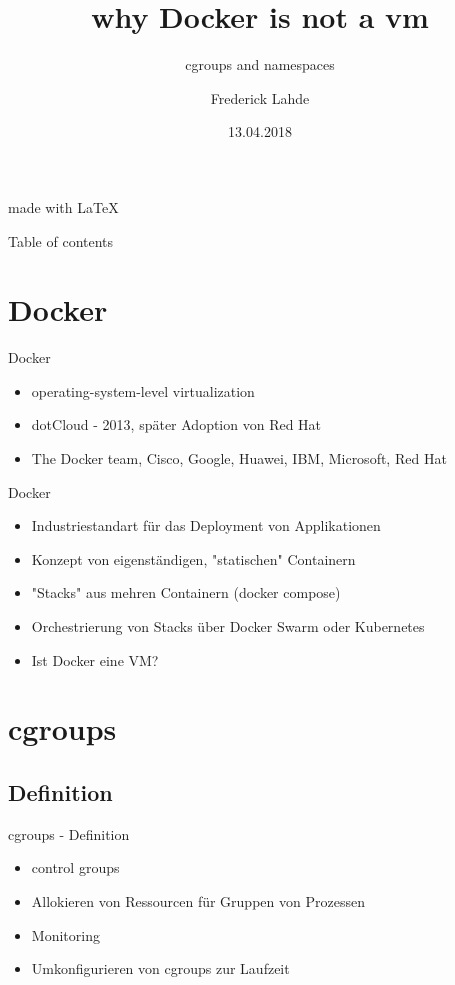 \documentclass[14pt]{beamer}
\author{
    Frederick Lahde
  }
\title[]{why Docker is not a vm}
\subtitle{cgroups and namespaces}
\institute{Hochschule Emden/Leer}
\date{13.04.2018}
\begin{document}
    \begin{frame}[plain]
      \maketitle
      \centering
      \begin{figure}[H]
      \end{figure}
      \tiny{made with \LaTeX}
    \end{frame}
  
    \begin{frame}{Table of contents}
      \setcounter{tocdepth}{1}
      \tableofcontents
    \end{frame}
    
    \section{Docker}
    \begin{frame}{Docker}
    \begin{itemize}
    \item operating-system-level virtualization
    \item dotCloud - 2013, später Adoption von Red Hat
    \item The Docker team, Cisco, Google, Huawei, IBM, Microsoft, Red Hat
    \end{itemize}
    \end{frame}
    
     \begin{frame}{Docker}
    \begin{itemize}
    \item Industriestandart für das Deployment von Applikationen
    \item Konzept von eigenständigen, "statischen" Containern
    \item "Stacks" aus mehren Containern (docker compose)
    \item Orchestrierung von Stacks über Docker Swarm oder Kubernetes
    \item Ist Docker eine VM?
    \end{itemize}
    \end{frame}
    
    \section{cgroups}
    \subsection{Definition}
    \begin{frame}{cgroups - Definition}
    	\begin{itemize}
    	\item control groups
        \item Allokieren von Ressourcen für Gruppen von Prozessen
        \item Monitoring
        \item Umkonfigurieren von cgroups zur Laufzeit
    	\end{itemize}
    \end{frame}
\end{document}
